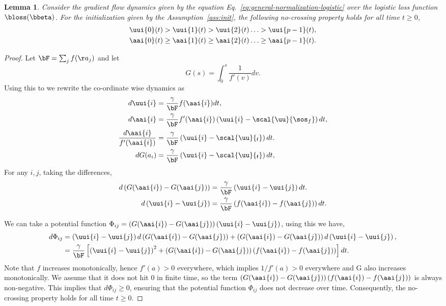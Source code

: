 \documentclass{article}
\theoremstyle{plain}
\newtheorem{lemma}[theorem]{Lemma}
\theoremstyle{definition}
\theoremstyle{remark}
\begin{document}
\begin{lemma}
    Consider the gradient flow dynamics given by the equation Eq.~\eqref{eq:general-normalization-logistic} over the logistic loss function $\bloss(\bbeta)$. For the initialization given by the Assumption~\ref{ass:init}, the following no-crossing property holds for all time $t \geq 0$,
    \begin{align*}
        \uui{0}(t) > \uui{1}(t) > \uui{2}(t) \ldots > \uui{p-1}(t), \\
        \aai{0} (t) \geq  \aai{1} (t) \geq \aai{2} (t) \ldots \geq \aai{p-1} (t).
     \end{align*}    
\end{lemma}
\begin{proof}
    Let $\bF = \sum_{j} f(\aa_j)$ and let $$ G(s) = \int_{0}^{s} \frac{1}{f'(v)} dv. $$ Using this to we rewrite the co-ordinate wise dynamics as 
    \begin{align*}
        d\uui{i} &= \frac{\gamma}{\bF} f(\aai{i}) dt, \\ 
        d\aai{i} &= \frac{\gamma}{\bF} f'(\aai{i}) \left( \uui{i} - \scal{\uu}{\sos_f} \right) dt, \\
        \frac{d \aai{i}}{f'(\aai{i})} &= \frac{\gamma}{\bF} \left( \uui{i} - \scal{\uu}{\sf_f} \right) dt. \\
        d{ G(a_i) } &= \frac{\gamma}{\bF} \left( \uui{i} - \scal{\uu}{\sf_f} \right) dt, \\
    \end{align*}
For any $i,j$, taking the differences, 
    \begin{align*}
        d \left( G(\aai{i}) - G(\aai{j}) \right) &= \frac{\gamma}{\bF} \left( \uui{i} - \uui{j} \right) dt. \\
        d \left( \uui{i} - \uui{j} \right) &= \frac{\gamma}{\bF} \left( f(\aai{i}) - f(\aai{j}) \right) dt.
    \end{align*}

    We can take a potential function $\Phi_{ij} = \left( G(\aai{i}) - G(\aai{j}) \right)\left( \uui{i} - \uui{j} \right)$, using this we have, 
    \begin{align*}
        d \Phi_{ij} &= \left( \uui{i} - \uui{j} \right) d \left( G(\aai{i}) - G(\aai{j}) \right) + \left( G(\aai{i}) - G(\aai{j}) \right) d \left( \uui{i} - \uui{j} \right), \\
        &= \frac{\gamma}{\bF} \left[ \left( \uui{i} - \uui{j} \right)^2 + \left( G(\aai{i}) - G(\aai{j}) \right) \left( f(\aai{i}) - f(\aai{j}) \right) \right] dt. 
    \end{align*}
    Note that $f$ increases monotonically, hence $f'(a) > 0$ everywhere, which implies $1/f'(a) > 0$ everywhere and G also increases monotonically. We assume that it does not hit $0$ in finite time, so the term $\left( G(\aai{i}) - G(\aai{j}) \right) \left( f(\aai{i}) - f(\aai{j}) \right)$ is always non-negative. This implies that $d \Phi_{ij} \geq 0$, ensuring that the potential function $\Phi_{ij}$ does not decrease over time. Consequently, the no-crossing property holds for all time $t \geq 0$.
\end{proof}
\end{document}
